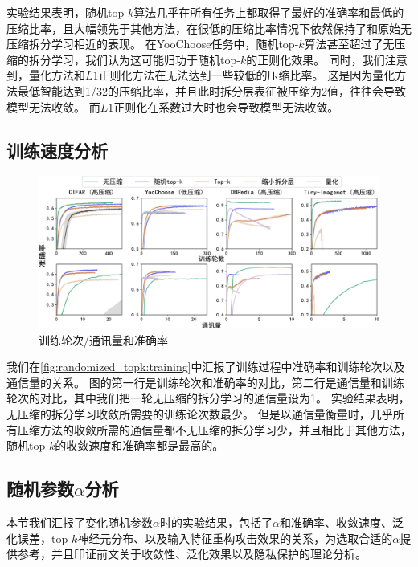 

实验结果表明，随机top-$k$算法几乎在所有任务上都取得了最好的准确率和最低的压缩比率，且大幅领先于其他方法，在很低的压缩比率情况下依然保持了和原始无压缩拆分学习相近的表现。
%
在YooChoose任务中，随机top-$k$算法甚至超过了无压缩的拆分学习，我们认为这可能归功于随机top-$k$的正则化效果。
%
同时，我们注意到，量化方法和$L1$正则化方法在无法达到一些较低的压缩比率。
这是因为量化方法最低智能达到1/32的压缩比率，并且此时拆分层表征被压缩为2值，往往会导致模型无法收敛。
而$L1$正则化在系数过大时也会导致模型无法收敛。
%

\subsection{训练速度分析}
\begin{figure}[h!]
    \centering
    \includegraphics[width=1\linewidth]{Z_Resources/随机topk_训练曲线.pdf}
    \caption{训练轮次/通讯量和准确率}
    \label{fig:randomized_topk:training}
\end{figure}


我们在\autoref*{fig:randomized_topk:training}中汇报了训练过程中准确率和训练轮次以及通信量的关系。
图的第一行是训练轮次和准确率的对比，第二行是通信量和训练轮次的对比，其中我们把一轮无压缩的拆分学习的通信量设为1。
%
实验结果表明，无压缩的拆分学习收敛所需要的训练论次数最少。
但是以通信量衡量时，几乎所有压缩方法的收敛所需的通信量都不无压缩的拆分学习少，并且相比于其他方法，随机top-$k$的收敛速度和准确率都是最高的。
%

\subsection{随机参数$\alpha$分析}
本节我们汇报了变化随机参数$\alpha$时的实验结果，包括了$\alpha$和准确率、收敛速度、泛化误差，top-$k$神经元分布、以及输入特征重构攻击效果的关系，为选取合适的$\alpha$提供参考，并且印证前文关于收敛性、泛化效果以及隐私保护的理论分析。


